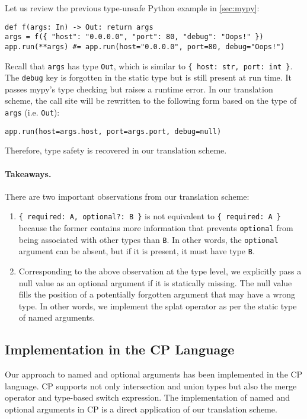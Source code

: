Let us review the previous type-unsafe Python example in \autoref{sec:mypy}:
\begin{lstlisting}[language={[3]Python}]
def f(args: In) -> Out: return args
args = f({ "host": "0.0.0.0", "port": 80, "debug": "Oops!" })
app.run(**args) #= app.run(host="0.0.0.0", port=80, debug="Oops!")
\end{lstlisting}
Recall that \lstinline{args} has type \lstinline{Out}, which is similar to
\lstinline|{ host: str, port: int }|. The \lstinline{debug} key is forgotten in
the static type but is still present at run time. It passes mypy's type checking
but raises a runtime error. In our translation scheme, the call site will be
rewritten to the following form based on the type of \lstinline{args} (i.e.
\lstinline{Out}):
\begin{lstlisting}[language={[3]Python}]
app.run(host=args.host, port=args.port, debug=null)
\end{lstlisting}
Therefore, type safety is recovered in our translation scheme.

\paragraph{Takeaways.}
There are two important observations from our translation scheme:
\begin{enumerate}
\item \lstinline|{ required: A, optional?: B }| is not equivalent to
      \lstinline|{ required: A }| because the former contains more information
      that prevents \lstinline{optional} from being associated with other types
      than \lstinline{B}. In other words, the \lstinline{optional} argument can
      be absent, but if it is present, it must have type \lstinline{B}.
\item Corresponding to the above observation at the type level, we explicitly
      pass a null value as an optional argument if it is statically missing. The
      null value fills the position of a potentially forgotten argument that may
      have a wrong type. In other words, we implement the splat operator as per
      the static type of named arguments.
\end{enumerate}

\subsection{Implementation in the CP Language}

Our approach to named and optional arguments has been implemented in the CP
language. CP supports not only intersection and union types but also the merge
operator and type-based switch expression. The implementation of named and
optional arguments in CP is a direct application of our translation scheme.

